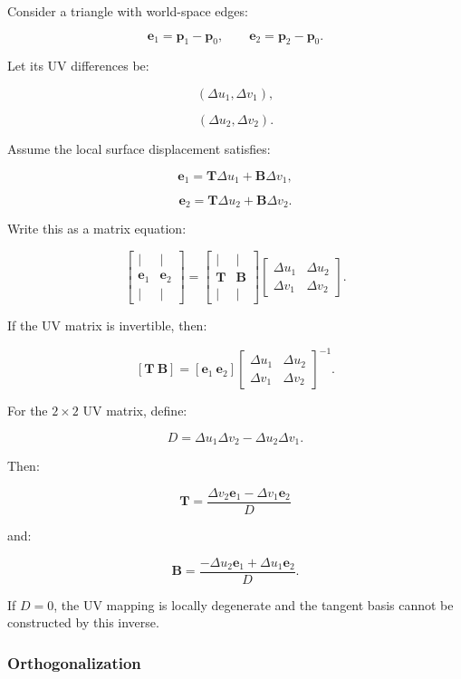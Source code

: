 Consider a triangle with world-space edges:

\[
 \mathbf e_1=\mathbf p_1-\mathbf p_0, \qquad \mathbf e_2=\mathbf p_2-\mathbf p_0.
\]

Let its UV differences be:

\[
 (\Delta u_1,\Delta v_1),
\]

\[
 (\Delta u_2,\Delta v_2).
\]

Assume the local surface displacement satisfies:

\[
 \mathbf e_1=\mathbf T\Delta u_1+\mathbf B\Delta v_1,
\]

\[
 \mathbf e_2=\mathbf T\Delta u_2+\mathbf B\Delta v_2.
\]

Write this as a matrix equation:

\[
 \begin{bmatrix} |&|\\ \mathbf e_1&\mathbf e_2\\ |&| \end{bmatrix} = \begin{bmatrix} |&|\\ \mathbf T&\mathbf B\\ |&| \end{bmatrix} \begin{bmatrix} \Delta u_1&\Delta u_2\\ \Delta v_1&\Delta v_2 \end{bmatrix}.
\]

If the UV matrix is invertible, then:

\[
 \boxed{ [\mathbf T\ \mathbf B] = [\mathbf e_1\ \mathbf e_2] \begin{bmatrix} \Delta u_1&\Delta u_2\\ \Delta v_1&\Delta v_2 \end{bmatrix}^{-1} }.
\]

For the \(2\times2\) UV matrix, define:

\[
 D=\Delta u_1\Delta v_2-\Delta u_2\Delta v_1.
\]

Then:

\[
 \boxed{ \mathbf T= \frac{ \Delta v_2\mathbf e_1-\Delta v_1\mathbf e_2 }{D} }
\]

and:

\[
 \boxed{ \mathbf B= \frac{ -\Delta u_2\mathbf e_1+\Delta u_1\mathbf e_2 }{D} }.
\]

If \(D=0\), the UV mapping is locally degenerate and the tangent basis cannot be constructed by this inverse.

\subsubsection{Orthogonalization}\label{orthogonalization}

